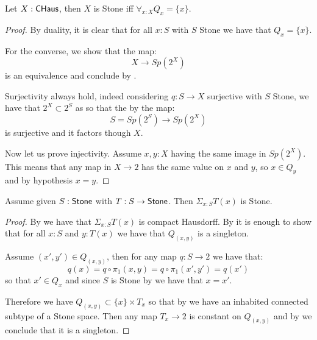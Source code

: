 \begin{lemma}\label{StoneCompactHausdorffTotallyDisconnected}
Let $X:\mathsf{CHaus}$, then $X$ is Stone iff $\forall_{x:X}Q_x=\{x\}$.
\end{lemma}

\begin{proof}
By duality, it is clear that for all $x:S$ with $S$ Stone we have that $Q_x=\{x\}$.

For the converse, we show that the map:
\[X\to Sp(2^X)\]
is an equivalence and conclude by . 

Surjectivity always hold, indeed considering $q:S\to X$ surjective with $S$ Stone, we have that $2^X\subset 2^S$ as so that the by  the map:
$$S = Sp(2^S)\to Sp(2^X)$$
is surjective and it factors though $X$.

Now let us prove injectivity. Assume $x,y:X$ having the same image in $Sp(2^X)$. This means that any map in $X\to 2$ has the same value on $x$ and $y$, so $x\in Q_y$ and by hypothesis $x=y$.
\end{proof}

\begin{theorem}
  \label{stone-sigma-closed}
Assume given $S:\mathsf{Stone}$ with $T:S\to\mathsf{Stone}$. Then $\Sigma_{x:S}T(x)$ is Stone.
\end{theorem}

\begin{proof}
By  we have that $\Sigma_{x:S}T(x)$ is compact Hausdorff. By  it is enough to show that for all $x:S$ and $y:T(x)$ we have that $Q_{(x,y)}$ is a singleton.

Assume $(x',y')\in Q_{(x,y)}$, then for any map $q:S\to 2$ we have that:
$$ q(x) = q\circ \pi_1(x,y) = q\circ \pi_1(x',y') = q(x')$$
so that $x'\in Q_x$ and since $S$ is Stone by  we have that $x=x'$.

Therefore we have $Q_{(x,y)}\subset \{x\}\times T_x$ so that by  we have an inhabited  connected subtype of a Stone space. Then any map $T_x\to 2$ is constant on $Q_{(x,y)}$ and by  we conclude that it is a singleton.
\end{proof}


